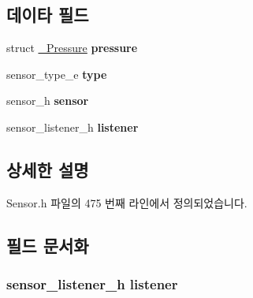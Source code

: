 \subsection*{데이타 필드}
\begin{DoxyCompactItemize}
\item 
\hypertarget{struct___pressure_extend_a9dba4e614ab2adf5a3ffa8d5bb899412}{struct \hyperlink{struct___pressure}{\-\_\-\-Pressure} {\bfseries pressure}}\label{struct___pressure_extend_a9dba4e614ab2adf5a3ffa8d5bb899412}

\item 
\hypertarget{struct___pressure_extend_abffb09766da2fc510a79bb51f82a36e1}{sensor\-\_\-type\-\_\-e {\bfseries type}}\label{struct___pressure_extend_abffb09766da2fc510a79bb51f82a36e1}

\item 
\hypertarget{struct___pressure_extend_a5bae9b7801bc3808411925cde81d3f26}{sensor\-\_\-h {\bfseries sensor}}\label{struct___pressure_extend_a5bae9b7801bc3808411925cde81d3f26}

\item 
\hypertarget{struct___pressure_extend_aa977dfb866b24fd7d9a20a9a01b2fd1f}{sensor\-\_\-listener\-\_\-h {\bfseries listener}}\label{struct___pressure_extend_aa977dfb866b24fd7d9a20a9a01b2fd1f}

\end{DoxyCompactItemize}


\subsection{상세한 설명}


Sensor.\-h 파일의 475 번째 라인에서 정의되었습니다.



\subsection{필드 문서화}
\hypertarget{struct___pressure_extend_aa977dfb866b24fd7d9a20a9a01b2fd1f}{
\subsubsection[{listener}]{\setlength{\rightskip}{0pt plus 5cm}sensor\-\_\-listener\-\_\-h listener}}\label{struct___pressure_extend_aa977dfb866b24fd7d9a20a9a01b2fd1f}


